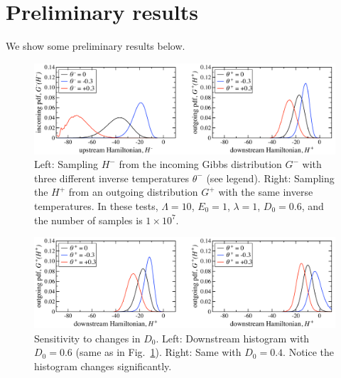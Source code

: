 \documentclass[12pt]{article}
\begin{document}
\section{Preliminary results}
We show some preliminary results below. 
\begin{figure}[p]%
\begin{center}
\includegraphics[width = 0.8 \textwidth]{Hist1}
\caption{Left: Sampling $H^-$ from the incoming Gibbs distribution $G^-$ with three different inverse temperatures $\theta^-$ (see legend). Right: Sampling the $H^+$ from an outgoing distribution $G^+$ with the same inverse temperatures.
In these tests, $\Lambda = 10$, $E_0 = 1$, $\lambda = 1$, $D_0 = 0.6$, and the number of samples is $1 \times 10^7$.}
\label{Hist1}
\end{center}
\end{figure}

\begin{figure}[p]%
\begin{center}
\includegraphics[width = 0.8 \textwidth]{Hist2}
\caption{Sensitivity to changes in $D_0$.
Left: Downstream histogram with $D_0 = 0.6$ (same as in Fig.~\ref{Hist1}). Right: Same with $D_0 = 0.4$. Notice the histogram changes significantly.
}
\label{Hist2}
\end{center}
\end{figure}
\end{document}
